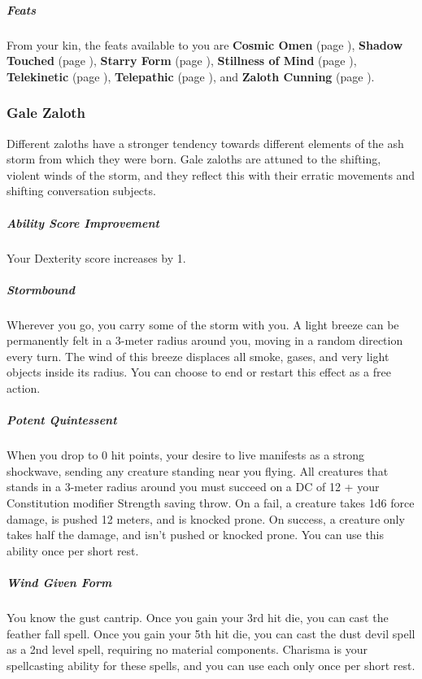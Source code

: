     \subparagraph{Feats} From your kin, the feats available to you are
    \textbf{Cosmic Omen} (page \pageref{feat::cosmicomen}),
    \textbf{Shadow Touched} (page \pageref{feat::shadowtouched}),
    \textbf{Starry Form} (page \pageref{feat::starryform}),
    \textbf{Stillness of Mind} (page \pageref{feat::stillnessofmind}),
    \textbf{Telekinetic} (page \pageref{feat::telekinetic}),
    \textbf{Telepathic} (page \pageref{feat::telepathic}), and
    \textbf{Zaloth Cunning} (page \pageref{feat::zalothcunning}).

\subsubsection{Gale Zaloth}
    Different zaloths have a stronger tendency towards different elements of the ash storm from which they were born.
    Gale zaloths are attuned to the shifting, violent winds of the storm, and they reflect this with their erratic movements and shifting conversation subjects.

    \subparagraph{Ability Score Improvement} Your Dexterity score increases by 1.

    \subparagraph{Stormbound} Wherever you go, you carry some of the storm with you.
    A light breeze can be permanently felt in a 3-meter radius around you, moving in a random direction every turn.
    The wind of this breeze displaces all smoke, gases, and very light objects inside its radius.
    You can choose to end or restart this effect as a free action.

    \subparagraph{Potent Quintessent} When you drop to 0 hit points, your desire to live manifests as a strong shockwave, sending any creature standing near you flying.
    All creatures that stands in a 3-meter radius around you must succeed on a DC of 12 + your Constitution modifier Strength saving throw.
    On a fail, a creature takes 1d6 force damage, is pushed 12 meters, and is knocked prone.
    On success, a creature only takes half the damage, and isn't pushed or knocked prone.
    You can use this ability once per short rest.

    \subparagraph{Wind Given Form} You know the gust cantrip.
    Once you gain your 3rd hit die, you can cast the feather fall spell.
    Once you gain your 5th hit die, you can cast the dust devil spell as a 2nd level spell, requiring no material components.
    Charisma is your spellcasting ability for these spells, and you can use each only once per short rest.

